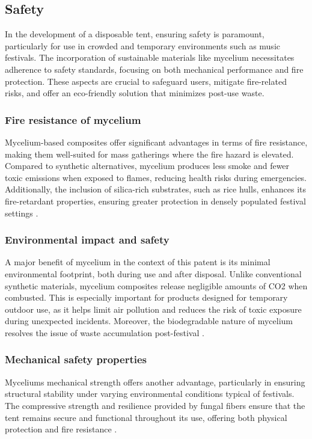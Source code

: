 \documentclass{article}
\begin{document}
\newpage
\subsection{Safety}
In the development of a disposable tent, ensuring safety is paramount, particularly for
use in crowded and temporary environments such as music festivals. The incorporation of
sustainable materials like mycelium necessitates adherence to safety standards, focusing
on both mechanical performance and fire protection. These aspects are crucial to safeguard
users, mitigate fire-related risks, and offer an eco-friendly solution that minimizes
post-use waste.

\subsubsection{Fire resistance of mycelium}
Mycelium-based composites offer significant advantages in terms of fire resistance, making
them well-suited for mass gatherings where the fire hazard is elevated. Compared to
synthetic alternatives, mycelium produces less smoke and fewer toxic emissions when
exposed to flames, reducing health risks during emergencies. Additionally, the inclusion
of silica-rich substrates, such as rice hulls, enhances its fire-retardant properties,
ensuring greater protection in densely populated festival settings
\parencite{jonesThermalDegradationFire2018}.

\subsubsection{Environmental impact and safety}
A major benefit of mycelium in the context of this patent is its minimal environmental
footprint, both during use and after disposal. Unlike conventional synthetic materials,
mycelium composites release negligible amounts of CO2 when combusted. This is especially
important for products designed for temporary outdoor use, as it helps limit air pollution
and reduces the risk of toxic exposure during unexpected incidents. Moreover, the
biodegradable nature of mycelium resolves the issue of waste accumulation post-festival
\parencite{madusankaReviewRecentAdvances2024}.

\subsubsection{Mechanical safety properties}
Myceliums mechanical strength offers another advantage, particularly in ensuring
structural stability under varying environmental conditions typical of festivals. The
compressive strength and resilience provided by fungal fibers ensure that the tent remains
secure and functional throughout its use, offering both physical protection and fire
resistance \parencite{polym16020262}.
\end{document}
